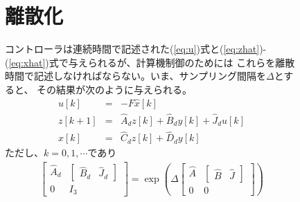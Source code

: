 \documentclass[a4j,11pt,twoside]{ujbook}
\begin{document}
\begin{figure}[htbp]
\begin{center}
	\section{離散化}
		コントローラは連続時間で記述された(\ref{eq:u})式と(\ref{eq:zhat})-(\ref{eq:xhat})式で与えられるが、計算機制御のためには
		これらを離散時間で記述しなければならない。いま、サンプリング間隔を$\Delta$とすると、
		その結果が次のように与えられる。
		\begin{eqnarray*}
			u[k]       & = & -F\hat{x}[k]\\
			z[k+1]     & = & \hat{A}_dz[k] + \hat{B}_dy[k] + \hat{J}_du[k]\\
			\hat{x}[k] & = & \hat{C}_dz[k] + \hat{D}_dy[k]
		\end{eqnarray*}
		ただし、$k = 0,1,\cdots$であり
		\begin{eqnarray*}
			\left[
				\begin{array}{cc}
					\hat{A}_d & \left[\begin{array}{cc} \hat{B}_d & \hat{J}_d \end{array}
					\right]\\
					0 & I_3
				\end{array}
			\right]
			=
			\exp{
				\left(
					\Delta
					\left[
					\begin{array}{cc}
						\hat{A} & \left[\begin{array}{cc} \hat{B} & \hat{J} \end{array}
						\right]\\
						0 & 0
					\end{array}
					\right]
				\right)
			}
		\end{eqnarray*}
		

\end{center}
\end{figure}
\end{document}
